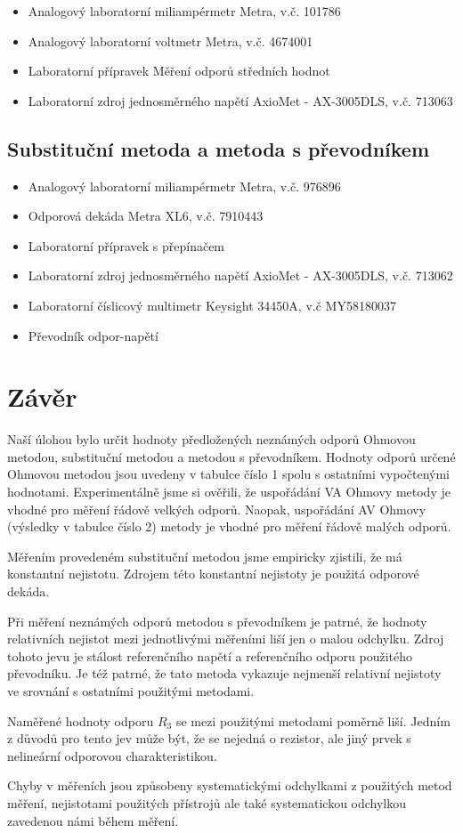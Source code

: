 \documentclass[a4paper, czech]{article}
\begin{document}
\begin{itemize}
    \item Analogový laboratorní miliampérmetr Metra, v.č. 101786
    \item Analogový laboratorní voltmetr Metra, v.č. 4674001
    \item Laboratorní přípravek Měření odporů středních hodnot
    \item Laboratorní zdroj jednosměrného napětí AxioMet - AX-3005DLS, v.č. 713063
\end{itemize}

\subsection{Substituční metoda a metoda s převodníkem}

\begin{itemize}
    \item Analogový laboratorní miliampérmetr Metra, v.č. 976896
    \item Odporová dekáda Metra XL6, v.č. 7910443
    \item Laboratorní přípravek s přepínačem
    \item Laboratorní zdroj jednosměrného napětí AxioMet - AX-3005DLS, v.č. 713062
    \item Laboratorní číslicový multimetr Keysight 34450A, v.č MY58180037
    \item Převodník odpor-napětí
\end{itemize}

\section{Závěr}

Naší úlohou bylo určit hodnoty předložených neznámých odporů Ohmovou metodou, substituční metodou a metodou s převodníkem.
Hodnoty odporů určené Ohmovou metodou jsou uvedeny v tabulce číslo 1 spolu s ostatními vypočtenými hodnotami.
Experimentálně jsme si ověřili, že uspořádání VA Ohmovy metody je vhodné pro měření řádově velkých odporů.
Naopak, uspořádání AV Ohmovy (výsledky v tabulce číslo 2) metody je vhodné pro měření řádově malých odporů.

Měřením provedeném substituční metodou jsme empiricky zjistili, že má konstantní nejistotu.
Zdrojem této konstantní nejistoty je použitá odporové dekáda.

Při měření neznámých odporů metodou s převodníkem je patrné, že hodnoty relativních nejistot mezi jednotlivými měřeními liší jen o malou odchylku.
Zdroj tohoto jevu je stálost referenčního napětí a referenčního odporu použitého převodníku.
Je též patrné, že tato metoda vykazuje nejmenší relativní nejistoty ve srovnání s ostatními použitými metodami.

Naměřené hodnoty odporu $R_3$ se mezi použitými metodami poměrně liší.
Jedním z důvodů pro tento jev může být, že se nejedná o rezistor, ale jiný prvek s nelineární odporovou charakteristikou.

Chyby v měřeních jsou způsobeny systematickými odchylkami z použitých metod měření, nejistotami použitých přístrojů ale také systematickou odchylkou zavedenou námi během měření.
\end{document}
